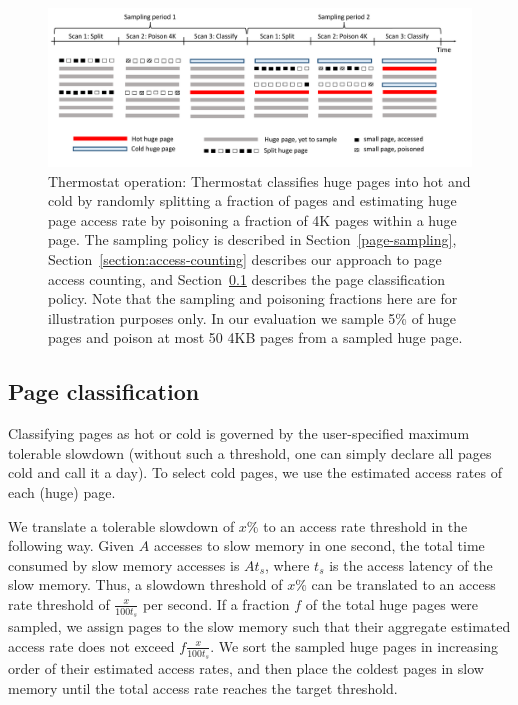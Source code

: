 \begin{figure}[t]
\centering
\includegraphics[width=\textwidth]{asplos2017/figures/new-policy-sampling-figure.pdf}
\caption{Thermostat operation: Thermostat classifies huge pages into hot and cold by randomly splitting a
fraction of pages and estimating huge page access rate by poisoning a fraction of 4K
pages within a huge page. The sampling policy is described in
Section~\ref{page-sampling}, Section~\ref{section:access-counting} describes our
approach to page access counting, and Section~\ref{page-classification} describes
the page classification policy. Note that the sampling and poisoning fractions here
are for illustration purposes only. In our evaluation we sample 5\% of huge pages
and poison at most 50 4KB pages from a sampled huge page.}
\label{fig:sampling}
\end{figure}

\subsection{Page classification}
\label{page-classification}
Classifying pages as hot or cold is governed by the user-specified maximum
tolerable slowdown (without such a threshold, one can simply declare all
pages cold and call it a day). To select cold pages, we use the estimated access
rates of each (huge) page.

We translate a tolerable slowdown of $x\%$ to an access rate
threshold in the following way. Given $A$ accesses to slow memory in one second,
the total time consumed by slow memory accesses is $At_s$, where $t_s$ is the
access latency of the slow memory.
Thus, a slowdown threshold of $x\%$ can be translated to an access rate
threshold of $\frac{x}{100t_s}$ per second. If a fraction $f$ of the total
huge pages were sampled, we assign pages to the slow memory such that their
aggregate estimated access rate does not exceed
$f\frac{x}{100t_s}$. We sort the sampled huge pages in increasing
order of their estimated access rates, and then place the coldest pages in slow
memory until the total access rate reaches the target threshold.

